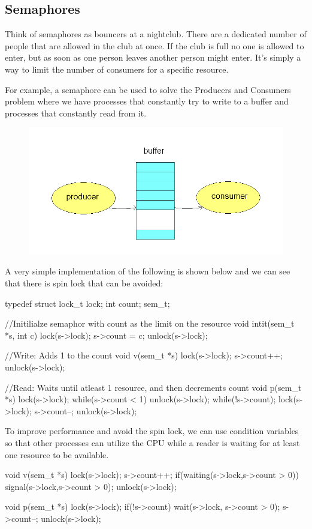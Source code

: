 \documentclass{hw}
\begin{document}
\subsection{Semaphores}
Think of semaphores as bouncers at a nightclub. There are a dedicated number of 
people that are allowed in the club at once. If the club is full no one is 
allowed to enter, but as soon as one person leaves another person might enter.
It's simply a way to limit the number of consumers for a specific resource. 

For example, a semaphore can be used to solve the Producers and Consumers problem
where we have processes that constantly try to write to a buffer and processes 
that constantly read from it.
\begin{figure}[H]
  \centering
  \includegraphics[scale=.45]{pcp}
\end{figure}

A very simple implementation of the following is shown below and we can see that 
there is spin lock that can be avoided:
\begin{C}
typedef struct{
    lock_t lock;
    int count;
}sem_t;

//Initilialze semaphor with count as the limit on the resource
void intit(sem_t *s, int c){
    lock(s->lock);
    s->count = c;
    unlock(s->lock);
}

//Write: Adds 1 to the count
void v(sem_t *s){
    lock(s->lock);
    s->count++;
    unlock(s->lock);
}

//Read: Waits until atleast 1 resource, and then decrements count
void p(sem_t *s){
    lock(s->lock);
    while(s->count < 1){
        unlock(s->lock);
        while(!s->count);
        lock(s->lock);
    }
    s->count--;
    unlock(s->lock);
}
\end{C}

To improve performance and avoid the spin lock,  we can use condition variables
so that other processes can utilize the CPU while a reader is waiting for at 
least one resource to be available. 
\begin{C}
void v(sem_t *s){
    lock(s->lock);
    s->count++;
    if(waiting(s->lock,s->count > 0)){
        signal(s->lock,s->count > 0);
    }
    unlock(s->lock);
}

void p(sem_t *s){
    lock(s->lock);
    if(!s->count){
        wait(s->lock, s->count > 0);
    }
    s->count--;
    unlock(s->lock);
}
\end{C}
\end{document}
